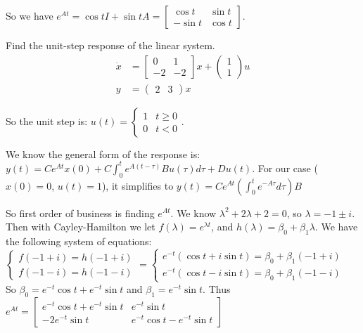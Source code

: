 \documentclass[11pt]{article}
\begin{document}
So we have $e^{At} = \cos t I + \sin t A = \begin{bmatrix}
    \cos t & \sin t \\ - \sin t & \cos t
\end{bmatrix}$.




Find the unit-step response of the linear system.
\begin{align*}
    \dot{x} &= \begin{bmatrix}
        0 & 1 \\ -2 & -2
    \end{bmatrix} x + \begin{pmatrix}
        1 \\ 1
    \end{pmatrix} u\\
    y &= \begin{pmatrix}
        2 & 3
    \end{pmatrix} x
\end{align*}
\soln

So the unit step is: $u(t) = \begin{cases}
    1 & t \geq 0\\
    0 & t < 0
\end{cases}$.

We know the general form of the response is:
$y(t) = Ce^{At}x(0) + C \int_0 ^t e^{A (t - \tau)} B u(\tau) d\tau + Du(t)$.
For our case ($x(0) = 0$, $u(t) = 1$), it simplifies to 
$y(t) = C e^{At} \left( \int_0^t e^{-A\tau} d\tau  \right)B$

So first order of business is finding $e^{At}$.
We know $\lambda^2 + 2 \lambda + 2 = 0$, so $\lambda = -1 \pm i$.
Then with Cayley-Hamilton we let $f(\lambda) = e^{\lambda t}$,
and $h(\lambda) = \beta_0 + \beta_1 \lambda$.
We have the following system of equations:
$\begin{cases}
    f(-1 + i) = h(-1 + i)\\
    f(-1 - i) = h(-1 - i)
\end{cases} = \begin{cases}
    e^{-t}(\cos t + i \sin t) = \beta_0 + \beta_1 (-1 + i)\\
    e^{-t}(\cos t - i \sin t) = \beta_0 + \beta_1 (-1 - i)
\end{cases}$\\
So $\beta_0 = e^{-t} \cos t + e^{-t} \sin t$ and $\beta_1 = e^{-t} \sin t$.
Thus $e^{At} = \begin{bmatrix}
    e^{-t} \cos t + e^{-t} \sin t & e^{-t} \sin t \\ - 2e^{-t} \sin t & e^{-t} \cos t - e^{-t} \sin t
\end{bmatrix}$
\end{document}
